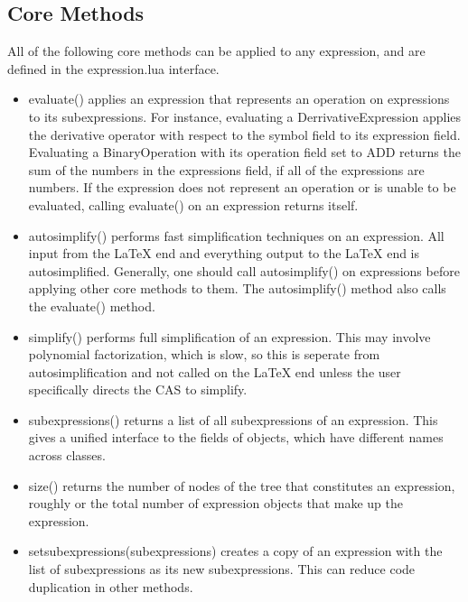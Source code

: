 \documentclass{article}
\begin{document}
\subsection{Core Methods}

All of the following core methods can be applied to any expression, and are defined in the {\ttfamily expression.lua} interface.

\begin{itemize}
    \item {\ttfamily evaluate()} applies an expression that represents an operation on expressions to its subexpressions. For instance, evaluating a {\ttfamily DerrivativeExpression} applies the derivative operator with respect to the {\ttfamily symbol} field to its {\ttfamily expression} field. Evaluating a {\ttfamily BinaryOperation} with its {\ttfamily operation} field set to {\ttfamily ADD} returns the sum of the numbers in the {\ttfamily expressions} field, if all of the expressions are numbers. If the expression does not represent an operation or is unable to be evaluated, calling {\ttfamily evaluate()} on an expression returns itself.
    
    \item {\ttfamily autosimplify()} performs fast simplification techniques on an expression. All input from the \LaTeX{} end and everything output to the \LaTeX{} end is autosimplified. Generally, one should call {\ttfamily autosimplify()} on expressions before applying other core methods to them. The {\ttfamily autosimplify()} method also calls the {\ttfamily evaluate()} method.
    
    \item {\ttfamily simplify()} performs full simplification of an expression. This may involve polynomial factorization, which is slow, so this is seperate from autosimplification and not called on the \LaTeX{} end unless the user specifically directs the CAS to simplify.
    
    \item {\ttfamily subexpressions()} returns a list of all subexpressions of an expression. This gives a unified interface to the fields of objects, which have different names across classes.
    
    \item {\ttfamily size()} returns the number of nodes of the tree that constitutes an expression, roughly or the total number of expression objects that make up the expression.
    
    \item {\ttfamily setsubexpressions(subexpressions)} creates a copy of an expression with the list of subexpressions as its new subexpressions. This can reduce code duplication in other methods.
    

\end{itemize}
\end{document}
